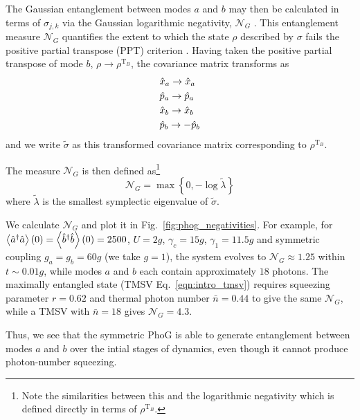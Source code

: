 The Gaussian entanglement between modes $a$ and $b$ may then be calculated in terms of $\sigma_{j, k}$ via the Gaussian logarithmic negativity, $\mathcal{N}_G$ \cite{Adesso2007, Simon2000}. This entanglement measure $\mathcal{N}_G$ quantifies the extent to which the state $\rho$ described by $\sigma$ fails the positive partial transpose (PPT) criterion \cite{Simon2000, Plenio2005}. Having taken the positive partial transpose of mode $b$, $\rho \rightarrow \rho^{\text{T}_B}$, the covariance matrix transforms as
\begin{align}
&\hat{x}_a \rightarrow \hat{x}_a \notag \\
%
&\hat{p}_a \rightarrow \hat{p}_a \notag \\
%
&\hat{x}_b \rightarrow \hat{x}_b \notag \\
%
&\hat{p}_b \rightarrow - \hat{p}_b \notag
\end{align}
and we write $\tilde{\sigma}$ as this transformed covariance matrix corresponding to $\rho^{\text{T}_B}$.

\noindent The measure $\mathcal{N}_G$ is then defined as\footnote{Note the similarities between this and the logarithmic negativity \cite{Plenio2005} which is defined directly in terms of $\rho^{\text{T}_B}$.}
\begin{equation}
\mathcal{N}_G = \max\left\{0, - \log \tilde{\lambda} \right\}
\end{equation}
where $\tilde{\lambda}$ is the smallest symplectic eigenvalue of $\tilde{\sigma}$. %

We calculate $\mathcal{N}_G$ and plot it in Fig.~\ref{fig:phog_negativities}. For example, for $\ev{\hat{a}^\dagger \hat{a}}\left(0\right) = \ev{\hat{b}^\dagger \hat{b}}\left(0\right) = 2500$, $U = 2 g$, $\gamma_c = 15 g$, $\gamma_1 = 11.5 g$ and symmetric coupling $g_a = g_b = 60 g$ (we take $g=1$), the system evolves to $\mathcal{N}_G \approx 1.25$ within $t \sim 0.01 g$, while modes $a$ and $b$ each contain approximately $18$ photons. The maximally entangled state (TMSV Eq.~\ref{eqn:intro_tmsv}) requires squeezing parameter $r = 0.62$ and thermal photon number $\bar{n} = 0.44$ to give the same $\mathcal{N}_G$, while a TMSV with $\bar{n}=18$ gives $\mathcal{N}_G = 4.3$.

 Thus, we see that the symmetric PhoG is able to generate entanglement between modes $a$ and $b$ over the intial stages of dynamics, even though it cannot produce photon-number squeezing. %


